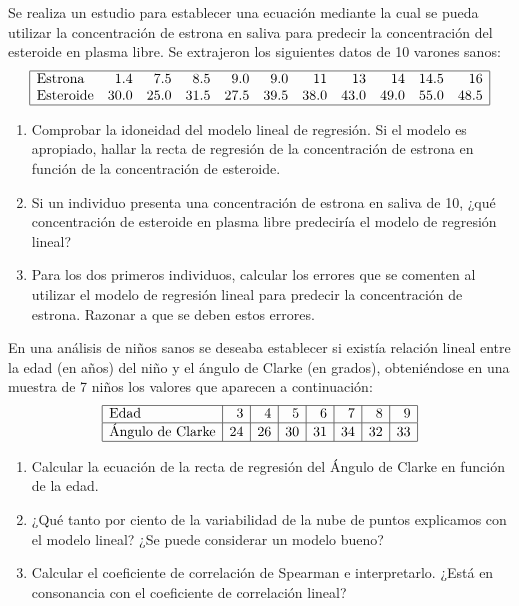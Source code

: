 {Se realiza un estudio para establecer una ecuación mediante la cual se pueda utilizar la concentración de estrona en saliva para predecir
la concentración del esteroide en plasma libre. Se extrajeron los siguientes datos de 10 varones sanos:
\[
\begin{array}{|lrrrrrrrrrr|}
\hline
\text{Estrona} & 1.4 & 7.5 & 8.5 & 9.0 & 9.0 & 11 & 13 & 14 & 14.5 & 16\\
\text{Esteroide} & 30.0 & 25.0 & 31.5 & 27.5 & 39.5 & 38.0 & 43.0 & 49.0 & 55.0 & 48.5\\
\hline
\end{array}
\]

\begin{enumerate}
\item Comprobar la idoneidad del modelo lineal de regresión. Si el modelo es apropiado, hallar la recta de regresión de la concentración de
estrona en función de la concentración de esteroide.
\item Si un individuo presenta una concentración de estrona en saliva de 10, ¿qué concentración de esteroide en plasma libre
predeciría el modelo de regresión lineal?
\item Para los dos primeros individuos, calcular los errores que se comenten al utilizar el modelo de regresión lineal para
predecir la concentración de estrona. Razonar a que se deben estos errores.
\end{enumerate}
}
{
}
{
}


{En una análisis de niños sanos se deseaba establecer si existía relación lineal entre la edad (en años) del niño y el ángulo de Clarke (en
grados), obteniéndose en una muestra de 7 niños los valores que aparecen a continuación:
\[
\begin{array}{|l|r|r|r|r|r|r|r|}
\hline
\text{Edad} & 3 & 4 & 5 & 6 & 7 & 8 & 9 \\
\hline
\text{Ángulo de Clarke} & 24 & 26 & 30 & 31 & 34 & 32 & 33\\
\hline
\end{array}
\]
\begin{enumerate}
\item Calcular la ecuación de la recta de regresión del Ángulo de Clarke en función de la edad.
\item ¿Qué tanto por ciento de la variabilidad de la nube de puntos explicamos con el modelo lineal? ¿Se puede considerar un modelo
bueno?
\item Calcular el coeficiente de correlación de Spearman e interpretarlo. ¿Está en consonancia con el coeficiente de correlación lineal?
\end{enumerate}
}
{
}
{
}



